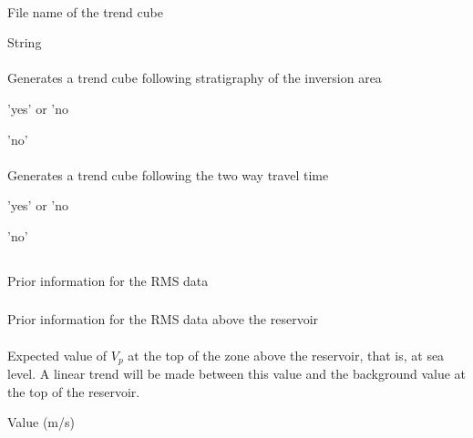 {\paragraph{}
 \slist
   \item \Description File name of the trend cube 
   \item \Argument String
   \item \Default 
 \elist

\paragraph{}
 \slist
   \item \Description Generates a trend cube following stratigraphy of the inversion area
   \item \Argument 'yes' or 'no
   \item \Default 'no'
 \elist

\paragraph{}
 \slist
   \item \Description Generates a trend cube following the two way travel time
   \item \Argument 'yes' or 'no
   \item \Default 'no'
 \elist

\subsection{}
 \slist
   \item \Description Prior information for the RMS data
   \item \Argument
   \item \Default
 \elist

\subsubsection{}
 \slist
   \item \Description Prior information for the RMS data above the reservoir
   \item \Argument
   \item \Default
 \elist

\paragraph{}
 \slist
   \item \Description Expected value of $V_p$ at the top of the zone above the reservoir, that is, at sea level. A linear trend will be made between this value and the background value at the top of the reservoir. 
   \item \Argument Value (m/s)
   \item \Default
 \elist

}
